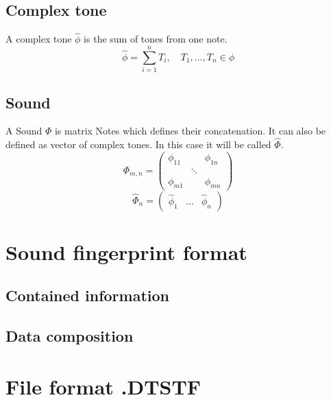 \documentclass[a4paper,12pt]{report}
\begin{document}
	\subsection{Complex tone}
	A complex tone 
	\begin{math}
		\widehat{\phi}
	\end{math}
	is the sum of tones from one note.
	\begin{equation*}
		\widehat{\phi}=\sum_{i=1}^{n}T_i, \quad T_1, \dots, T_n\in\phi
	\end{equation*}
	
	\subsection{Sound}
	A Sound
	\begin{math}
		\Phi
	\end{math}
	is matrix Notes which defines their concatenation. It can also be defined as vector of complex tones. In this case it will be called 
	\begin{math}
		\widehat{\Phi}
	\end{math}.
	\begin{equation*}
		\Phi_{m,n}= 
		\begin{pmatrix}
			\phi_{11}&&\phi_{1n}\\
			&\ddots&\\
			\phi_{m1}&&\phi_{mn}

		\end{pmatrix}
	\end{equation*}
	\begin{equation*}
		\widehat{\Phi}_n=
		\begin{pmatrix}
			\widehat{\phi}_1&\dots&\widehat{\phi}_n
		\end{pmatrix}
	\end{equation*}
	
	\section{Sound fingerprint format}
	\subsection{Contained information}
	\subsection{Data composition}

	\section{File format .DTSTF}
\end{document}
